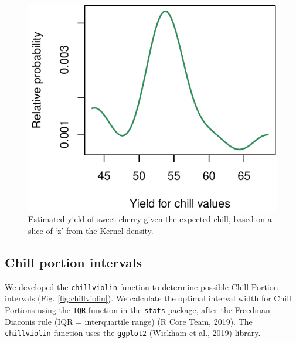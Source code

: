 \documentclass[]{article}
\begin{document}
\begin{figure}
\centering
\includegraphics{Abstract_SHE_Chill_Yield_Model_files/figure-latex/chillkernelslice-1.pdf}
\caption{\label{fig:chillkernelslice}Estimated yield of sweet cherry
given the expected chill, based on a slice of `z' from the Kernel
density.}
\end{figure}

\hypertarget{chill-portion-intervals}{%
\subsection{Chill portion intervals}\label{chill-portion-intervals}}

We developed the \texttt{chillviolin} function to determine possible
Chill Portion intervals (Fig. \ref{fig:chillviolin}). We calculate the
optimal interval width for Chill Portions using the \texttt{IQR}
function in the \texttt{stats} package, after the Freedman-Diaconis rule
(IQR = interquartile range) (R Core Team, 2019). The
\texttt{chillviolin} function uses the \texttt{ggplot2} (Wickham et al.,
2019) library.
\end{document}
